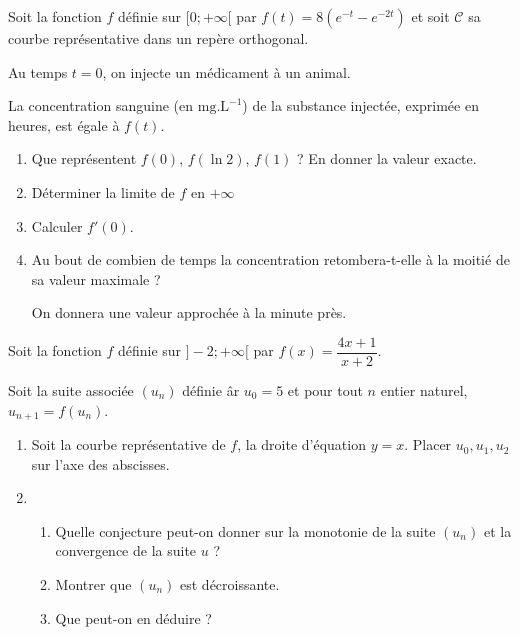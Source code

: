 \begin{question}[topic=exponentielle,class=IG]
  Soit la fonction $f$ définie sur $[0;+\infty[$ par $f(t) = 8(e^{-t} -
  e^{-2t})$ et soit $\mathcal{C}$ sa courbe représentative dans un
  repère orthogonal.

  Au temps $t = 0$, on injecte un médicament à un animal.

  La concentration sanguine (en $\mathrm{mg.L^{-1}}$) de la substance
  injectée, exprimée en heures, est égale à $f(t)$.

  \begin{enumerate}
    \item Que représentent $f(0)$, $f(\ln 2)$, $f(1)$ ? En donner la valeur
      exacte.
    \item Déterminer la limite de $f$ en $+\infty$
    \item Calculer $f'(0)$.
    \item Au bout de combien de temps la concentration retombera-t-elle à la
      moitié de sa valeur maximale ?

      On donnera une valeur approchée à la minute près.
  \end{enumerate}
\end{question}

\begin{question}[topic=suites,class=IG]
  Soit la fonction $f$ définie sur $]-2; +\infty[$ par $f(x) =
  \dfrac{4x+1}{x+2}$.

  Soit la suite associée $(u_n)$ définie âr $u_0 = 5$ et pour tout $n$
  entier naturel, $u_{n+1} = f(u_n)$.

  \begin{enumerate}
    \item Soit la courbe représentative de $f$, la droite d'équation $y =
      x$. Placer $u_0, u_1, u_2$ sur l'axe des abscisses.

      \begin{center}
      \end{center}
    \item
      \begin{enumerate}
        \item Quelle conjecture peut-on donner sur la monotonie de la suite
          $(u_n)$ et la convergence de la suite $u$ ?
        \item Montrer que $(u_n)$ est décroissante.
        \item Que peut-on en déduire ?
      \end{enumerate}
  \end{enumerate}
\end{question}

